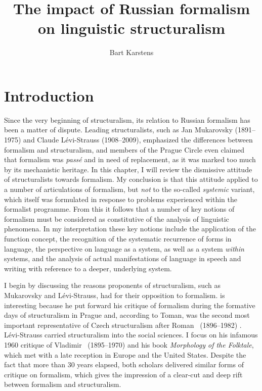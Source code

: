 \documentclass[output=paper]{langscibook}
\author{Bart Karstens \affiliation{Vrije Universiteit Amsterdam}}
\title{The impact of Russian formalism on linguistic structuralism}
\begin{document}
\maketitle

\section{Introduction} 
\label{sec:karstens:intro}

Since the very beginning of structuralism, its relation to Russian formalism has been a matter of dispute. Leading structuralists, such as Jan Muka\-rov\-sky (1891--1975) and Claude Lévi-Strauss (1908--2009), emphasized the differences between formalism and structuralism, and members of the Prague Circle even claimed that formalism was \emph{passé} and in need of replacement, as it was marked too much by its mechanistic heritage. In this chapter, I will review the dismissive attitude of structuralists towards formalism. My conclusion is that this attitude applied to a number of articulations of formalism, but \emph{not} to the so-called \emph{systemic} variant, which itself was formulated in response to problems experienced within the formalist programme. From this it follows that a number of key notions of formalism must be considered as constitutive of the  analysis of linguistic phenomena. In my interpretation these key notions include the application of the function concept, the recognition of the systematic recurrence of forms in language, the perspective on language as a system, as well as a system \emph{within} systems, and the analysis of actual manifestations of language in speech and writing with reference to a deeper, underlying system.

I begin by discussing the reasons proponents of structuralism, such as Mu\-ka\-rov\-sky and Lévi-Strauss, had for their opposition to formalism. {\Mukarovsky} is interesting because he put forward his critique of formalism during the formative days of structuralism in Prague and, according to Toman, {\Mukarovsky} was the second most important representative of Czech structuralism after Roman {\Jakobson}~(1896--1982) \citep[128]{Toman1995}. Lévi-Strauss carried structuralism into the social sciences. I focus on his infamous 1960 critique of Vladimir {\Propp}~(1895--1970) and his \citeyear{Propp1928} book \emph{Morphology of the Folktale}, which met with a late reception in Europe and the United States. Despite the fact that more than 30 years elapsed, both scholars delivered similar forms of critique on formalism, which gives the impression of a clear-cut and deep rift between formalism and structuralism.  
\end{document}
